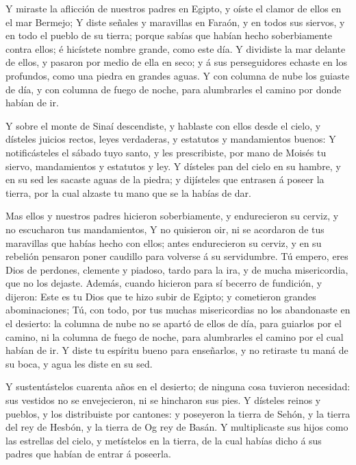  Y miraste la aflicción de nuestros padres en Egipto, y
oíste el clamor de ellos en el mar Bermejo;  Y diste
señales y maravillas en Faraón, y en todos sus siervos, y en todo el
pueblo de su tierra; porque sabías que habían hecho soberbiamente contra
ellos; é hicístete nombre grande, como este día.  Y
dividiste la mar delante de ellos, y pasaron por medio de ella en seco;
y á sus perseguidores echaste en los profundos, como una piedra en
grandes aguas.  Y con columna de nube los guiaste de día, y
con columna de fuego de noche, para alumbrarles el camino por donde
habían de ir.

 Y sobre el monte de Sinaí descendiste, y hablaste con
ellos desde el cielo, y dísteles juicios rectos, leyes verdaderas, y
estatutos y mandamientos buenos:  Y notificásteles el
sábado tuyo santo, y les prescribiste, por mano de Moisés tu siervo,
mandamientos y estatutos y ley.  Y dísteles pan del cielo
en su hambre, y en su sed les sacaste aguas de la piedra; y dijísteles
que entrasen á poseer la tierra, por la cual alzaste tu mano que se la
habías de dar.

 Mas ellos y nuestros padres hicieron soberbiamente, y
endurecieron su cerviz, y no escucharon tus mandamientos, 
Y no quisieron oir, ni se acordaron de tus maravillas que habías hecho
con ellos; antes endurecieron su cerviz, y en su rebelión pensaron poner
caudillo para volverse á su servidumbre. Tú empero, eres Dios de
perdones, clemente y piadoso, tardo para la ira, y de mucha
misericordia, que no los dejaste.  Además, cuando hicieron
para sí becerro de fundición, y dijeron: Este es tu Dios que te hizo
subir de Egipto; y cometieron grandes abominaciones;  Tú,
con todo, por tus muchas misericordias no los abandonaste en el
desierto: la columna de nube no se apartó de ellos de día, para guiarlos
por el camino, ni la columna de fuego de noche, para alumbrarles el
camino por el cual habían de ir.  Y diste tu espíritu bueno
para enseñarlos, y no retiraste tu maná de su boca, y agua les diste en
su sed.

 Y sustentástelos cuarenta años en el desierto; de ninguna
cosa tuvieron necesidad: sus vestidos no se envejecieron, ni se
hincharon sus pies.  Y dísteles reinos y pueblos, y los
distribuiste por cantones: y poseyeron la tierra de Sehón, y la tierra
del rey de Hesbón, y la tierra de Og rey de Basán.  Y
multiplicaste sus hijos como las estrellas del cielo, y metístelos en la
tierra, de la cual habías dicho á sus padres que habían de entrar á
poseerla.

